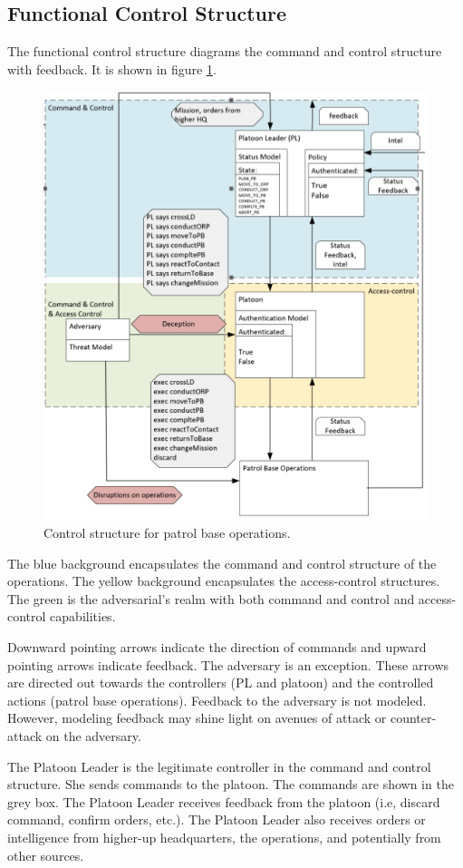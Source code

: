 \documentclass[../../main/main.tex]{subfiles}
\begin{document}
\subsection{Functional Control Structure}
The functional control structure diagrams the command and control structure with feedback.  It is shown in figure \ref{controlstr1}.
\begin{figure}[ht!]
\begin{center}
\includegraphics[width=0.7\linewidth]{../figures/controlstr1}
\caption{Control structure for patrol base operations.}
\label{controlstr1}
\end{center}
\end{figure}
 
The blue background encapsulates the command and control structure of the operations.  The yellow background encapsulates the access-control structures.  The green is the adversarial's realm with both command and control and access-control capabilities.  
 
Downward pointing arrows indicate the direction of commands and upward pointing arrows indicate feedback.  The adversary is an exception. These arrows are directed out towards the controllers (PL and platoon) and the controlled actions (patrol base operations).  Feedback to the adversary is not modeled.  However, modeling feedback may shine light on avenues of attack or counter-attack on the adversary.

The Platoon Leader is the legitimate controller in the command and control structure.  She sends commands to the platoon.  The commands are shown in the grey box.  The Platoon Leader receives feedback from the platoon (i.e, discard command, confirm orders, etc.).  The Platoon Leader also receives orders or intelligence from higher-up headquarters, the operations, and potentially from other sources. 
\end{document}
